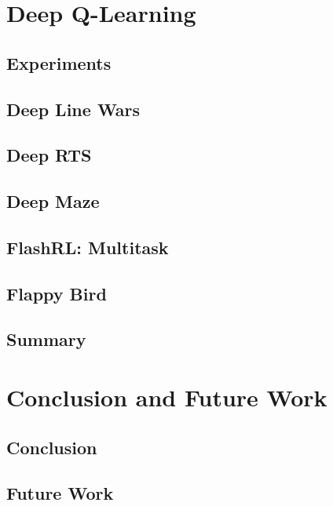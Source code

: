 \documentclass{uia}
\begin{document}
\chapter{Deep Q-Learning}
\label{chap:results:dqn}


\section{Experiments}

\section{Deep Line Wars}

\section{Deep RTS}

\section{Deep Maze}

\section{FlashRL: Multitask}

\section{Flappy Bird}

\section{Summary}

\chapter{Conclusion and Future Work}
\label{chap:conclusion}

\section{Conclusion}
\label{sec:conclusion}

\section{Future Work}
\label{sec:conclusion:future_work}

\cleardoublepage
\renewcommand{\bibname}{References}


\end{document}
